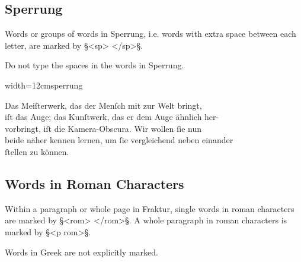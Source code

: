 
\tocspace
\subsection{Sperrung}
\label{section sperrung}

\begin{mainrule}
Words or groups of words in Sperrung, i.e. words with extra space between each letter, are marked by §<sp> </sp>§.
\end{mainrule}

\begin{clarification}
Do not type the spaces in the words in Sperrung.
\end{clarification}

\vspace{3mm}
\begin{sampleImageSmall}{width=12cm}{sperrung}
\begin{typeLatin}
Das Meiſterwerk, das der Menſch mit zur Welt bringt, \\
iſt das Auge; das Kunſtwerk, das er dem Auge ähnlich her- \\
vorbringt, iſt die Kamera-Obscura. Wir wollen ſie nun \\
beide näher kennen lernen, um ſie vergleichend neben einander \\
ſtellen zu können.
\end{typeLatin}
\end{sampleImageSmall}

\tocspace
\subsection{Words in Roman Characters}
\label{section words in roman characters}

\begin{mainrule}
Within a paragraph or whole page in Fraktur, single words in roman characters are marked by  §<rom> </rom>§. A whole paragraph in roman characters is marked by §<p rom>§.
\end{mainrule}

\begin{clarification}
Words in Greek are not explicitly marked.
\end{clarification}

